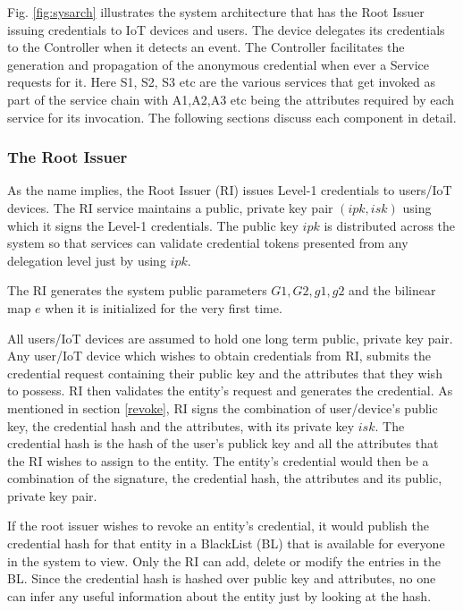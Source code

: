 \documentclass[journal]{IEEEtran}
\begin{document}
Fig. \ref{fig:sysarch} illustrates the system architecture that has the Root Issuer issuing credentials to IoT devices and users. The device delegates its credentials to the Controller when it detects an event. The Controller facilitates the generation and propagation of the anonymous credential when ever a Service requests for it. Here S1, S2, S3 etc are the various services that get invoked as part of the service chain with A1,A2,A3 etc being the attributes required by each service for its invocation. The following sections discuss each component in detail.

\subsubsection{The Root Issuer}
As the name implies, the Root Issuer (RI) issues Level-1 credentials to users/IoT devices. The RI service maintains a public, private key pair $(ipk,isk)$ using which it signs the Level-1 credentials. The public key $ipk$ is distributed across the system so that services can validate credential tokens presented from any delegation level just by using $ipk$.

The RI generates the system public parameters $G1, G2, g1, g2$ and the bilinear map $e$ when it is initialized for the very first time.

All users/IoT devices are assumed to hold one long term public, private key pair. Any user/IoT device which wishes to obtain credentials from RI, submits the credential request containing their public key and the attributes that they wish to possess. RI then validates the entity's request and generates the credential. As mentioned in section \ref{revoke}, RI signs the combination of user/device's public key, the credential hash and the attributes, with its private key $isk$. The credential hash is the hash of the user's publick key and all the attributes that the RI wishes to assign to the entity. The entity's credential would then be a combination of the signature, the credential hash, the attributes and its public, private key pair.

If the root issuer wishes to revoke an entity's credential, it would publish the credential hash for that entity in a BlackList (BL) that is available for everyone in the system to view. Only the RI can add, delete or modify the entries in the BL. Since the credential hash is hashed over public key and attributes, no one can infer any useful information about the entity just by looking at the hash.
\end{document}
